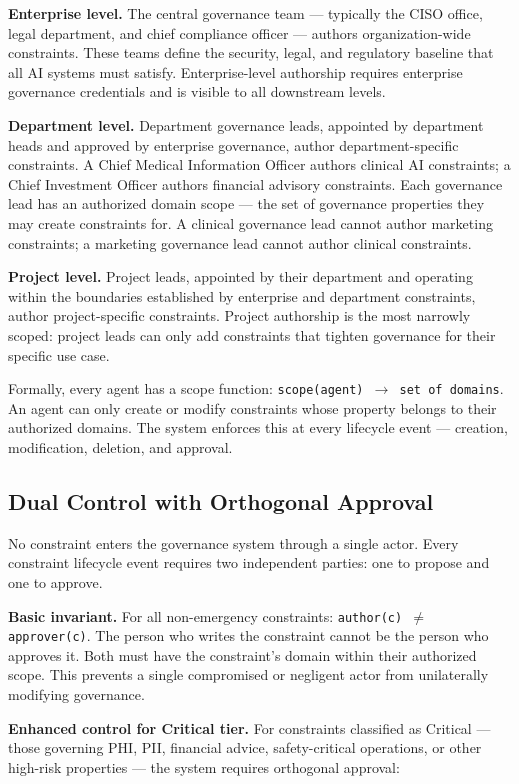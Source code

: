 \textbf{Enterprise level.} The central governance team --- typically the CISO office, legal department, and chief compliance officer --- authors organization-wide constraints. These teams define the security, legal, and regulatory baseline that all AI systems must satisfy. Enterprise-level authorship requires enterprise governance credentials and is visible to all downstream levels.

\textbf{Department level.} Department governance leads, appointed by department heads and approved by enterprise governance, author department-specific constraints. A Chief Medical Information Officer authors clinical AI constraints; a Chief Investment Officer authors financial advisory constraints. Each governance lead has an authorized domain scope --- the set of governance properties they may create constraints for. A clinical governance lead cannot author marketing constraints; a marketing governance lead cannot author clinical constraints.

\textbf{Project level.} Project leads, appointed by their department and operating within the boundaries established by enterprise and department constraints, author project-specific constraints. Project authorship is the most narrowly scoped: project leads can only add constraints that tighten governance for their specific use case.

Formally, every agent has a scope function: \texttt{scope(agent) $\to$ set of domains}. An agent can only create or modify constraints whose property belongs to their authorized domains. The system enforces this at every lifecycle event --- creation, modification, deletion, and approval.

\subsection{Dual Control with Orthogonal Approval}


No constraint enters the governance system through a single actor. Every constraint lifecycle event requires two independent parties: one to propose and one to approve.

\textbf{Basic invariant.} For all non-emergency constraints: \texttt{author(c) $\neq$ approver(c)}. The person who writes the constraint cannot be the person who approves it. Both must have the constraint's domain within their authorized scope. This prevents a single compromised or negligent actor from unilaterally modifying governance.

\textbf{Enhanced control for Critical tier.} For constraints classified as Critical --- those governing PHI, PII, financial advice, safety-critical operations, or other high-risk properties --- the system requires orthogonal approval:

